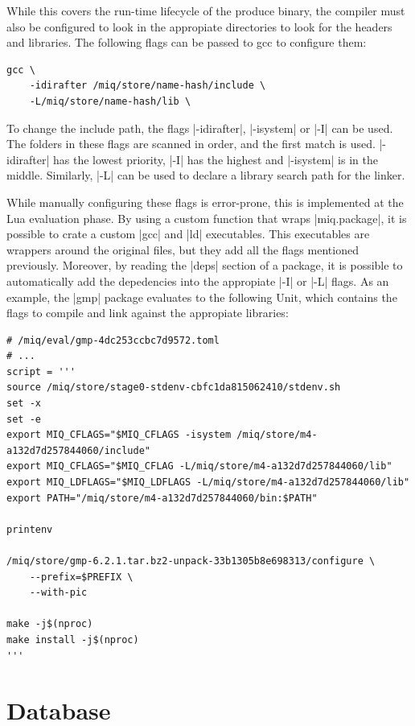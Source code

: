 While this covers the run-time lifecycle of the produce
binary, the compiler must also be configured to look in the
appropiate directories to look for the headers and
libraries. The following flags can be passed to gcc to
configure them:

\begin{verbatim}
gcc \
    -idirafter /miq/store/name-hash/include \
    -L/miq/store/name-hash/lib \
\end{verbatim}

To change the include path, the flags |-idirafter|,
|-isystem| or |-I| can be used. The folders in these flags
are scanned in order, and the first match is used.
|-idirafter| has the lowest priority, |-I| has the highest
and |-isystem| is in the middle.
Similarly, |-L| can be used to declare a library search path
for the linker.

While manually configuring these flags is error-prone, this
is implemented at the Lua evaluation phase. By using a
custom function that wraps |miq.package|, it is possible to
crate a custom |gcc| and |ld| executables. This executables
are wrappers around the original files, but they add all the
flags mentioned previously. Moreover, by reading the |deps|
section of a package, it is possible to automatically add
the depedencies into the appropiate |-I| or |-L| flags. As
an example, the |gmp| package evaluates to the following
Unit, which contains the flags to compile and link against
the appropiate libraries:

\begin{verbatim}
# /miq/eval/gmp-4dc253ccbc7d9572.toml
# ...
script = '''
source /miq/store/stage0-stdenv-cbfc1da815062410/stdenv.sh
set -x
set -e
export MIQ_CFLAGS="$MIQ_CFLAGS -isystem /miq/store/m4-a132d7d257844060/include"
export MIQ_CFLAGS="$MIQ_CFLAG -L/miq/store/m4-a132d7d257844060/lib"
export MIQ_LDFLAGS="$MIQ_LDFLAGS -L/miq/store/m4-a132d7d257844060/lib"
export PATH="/miq/store/m4-a132d7d257844060/bin:$PATH"

printenv

/miq/store/gmp-6.2.1.tar.bz2-unpack-33b1305b8e698313/configure \
    --prefix=$PREFIX \
    --with-pic

make -j$(nproc)
make install -j$(nproc)
'''

\end{verbatim}

\section{Database}

